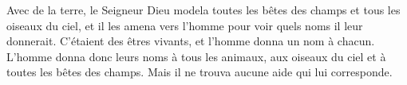 Avec de la terre, le Seigneur Dieu modela toutes les bêtes des champs
	et tous les oiseaux du ciel,
	et il les amena vers l’homme pour voir quels noms il leur donnerait.
C’étaient des êtres vivants, et l’homme donna un nom à chacun.
L’homme donna donc leurs noms à tous les animaux,
	aux oiseaux du ciel et à toutes les bêtes des champs.
	Mais il ne trouva aucune aide qui lui corresponde.
